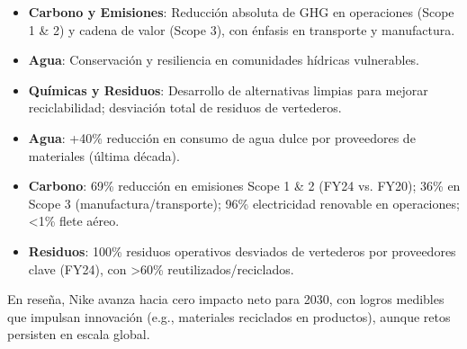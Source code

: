 
\begin{itemize}[label=$\bullet$]
\item \textbf{Carbono y Emisiones}: Reducción absoluta de GHG en operaciones (Scope 1 \& 2) y cadena de valor 
	(Scope 3), con énfasis en transporte y manufactura.
\item \textbf{Agua}: Conservación y resiliencia en comunidades hídricas vulnerables.
\item \textbf{Químicas y Residuos}: Desarrollo de alternativas limpias para mejorar reciclabilidad; desviación total de residuos de vertederos.
\end{itemize}
\begin{itemize}
\item \textbf{Agua}: +40\% reducción en consumo de agua dulce por proveedores de materiales (última década).
\item \textbf{Carbono}: 69\% reducción en emisiones Scope 1 \& 2 (FY24 vs. FY20); 36\% en Scope 3 (manufactura/transporte); 96\% electricidad renovable en operaciones; <1\% flete aéreo.
\item \textbf{Residuos}: 100\% residuos operativos desviados de vertederos por proveedores clave (FY24), con >60\% reutilizados/reciclados.
\end{itemize}
En reseña, Nike avanza hacia cero impacto neto para 2030, con logros medibles que impulsan innovación (e.g., materiales reciclados en productos), aunque retos persisten en escala global.






